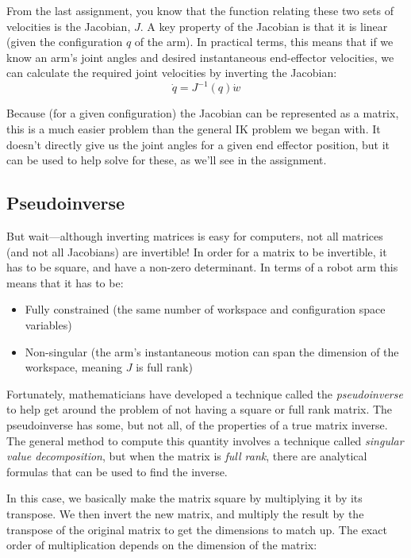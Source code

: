 \documentclass{16384_doc}
\begin{document}
From the last assignment, you know that the function relating these two sets
of velocities is the Jacobian, $J$.  A key property of the Jacobian is that it is
linear (given the configuration $q$ of the arm).  In practical terms, this means
that if we know an arm’s joint angles and desired instantaneous end-effector
velocities, we can calculate the required joint velocities by inverting the
Jacobian:
\[
\dot q = J^{-1}(q) \dot w
\]

Because (for a given configuration) the Jacobian can be represented as a matrix, this is a much easier problem than the general IK problem we began with. It doesn't directly give us
the joint angles for a given end effector position, but it can be used to help
solve for these, as we'll see in the assignment.

\subsection{Pseudoinverse}

But wait---although inverting matrices is easy for computers, not all matrices
(and not all Jacobians) are invertible!  In order for a matrix to be invertible,
it has to be square, and have a non-zero determinant.  In terms of a robot arm
this means that it has to be:
\begin{itemize}
 \item Fully constrained (the same number of workspace and configuration space
  variables)
 \item Non-singular (the arm’s instantaneous motion can span the dimension of
  the workspace, meaning $J$ is full rank)
\end{itemize}

Fortunately, mathematicians have developed a technique called the
\emph{pseudoinverse} to help get around the problem of not having a square or
full rank matrix.  The pseudoinverse has some, but not all, of the properties of
a true matrix inverse.  The general method to compute this quantity involves
a technique called \emph{singular value decomposition}, but when the matrix is
\emph{full rank}, there are analytical formulas that can be used to find the inverse.

In this case, we basically make the matrix square by multiplying it by its
transpose.  We then invert the new matrix, and multiply the result by the
transpose of the original matrix to get the dimensions to match up. The exact
order of multiplication depends on the dimension of the matrix:
\end{document}
